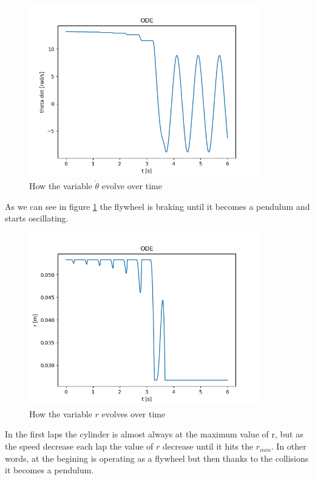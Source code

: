 \begin{figure}[H]
	\centering
	\includegraphics[width=10cm]{img/simulation/d_theta_t.png}
	\caption{How the variable $\dot{\theta}$ evolve over time}
	\label{fig:d theta t diagram}
\end{figure}
As we can see in figure \ref{fig:d theta t diagram} the flywheel is braking until it becomes a pendulum and starts oscillating.

\begin{figure}[H]
	\centering
	\includegraphics[width=10cm]{img/simulation/r_t.png}
	\caption{How the variable $r$ evolves over time}
	\label{fig:r t diagram}
\end{figure}
In the first laps the cylinder is almost always at the maximum value of r, but as the
speed decrease each lap the value of $r$ decrease until it hits the $r_{min}$.
In other words, at the begining is operating as a flywheel but then thanks to the
collisions it becomes a pendulum.

